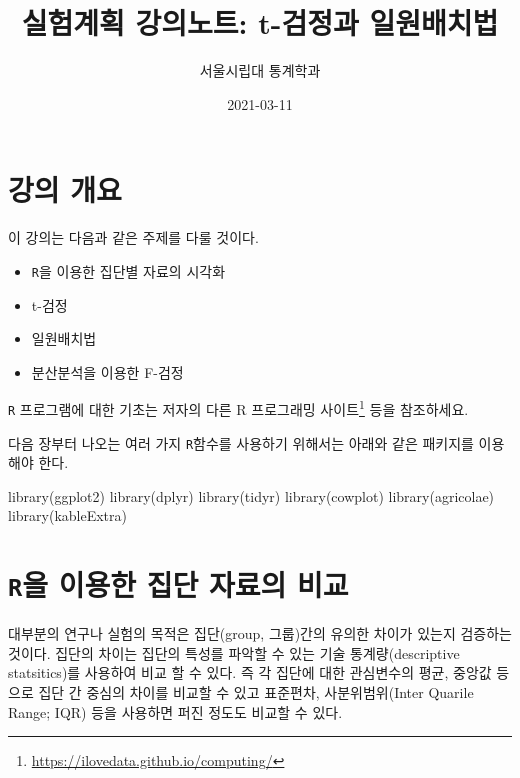 \documentclass[
]{book}
\title{실험계획 강의노트: t-검정과 일원배치법}
\author{서울시립대 통계학과}
\date{2021-03-11}
\newenvironment{Shaded}{\begin{snugshade}}{\end{snugshade}}
\newcommand{\FunctionTok}[1]{\textcolor[rgb]{0.00,0.00,0.00}{#1}}
\newcommand{\NormalTok}[1]{#1}
\providecommand{\tightlist}{%
  \setlength{\itemsep}{0pt}\setlength{\parskip}{0pt}}
\renewcommand{\href}[2]{#2\footnote{\url{#1}}}
\begin{document}
\maketitle

{
\setcounter{tocdepth}{1}
\tableofcontents
}
\hypertarget{uxac15uxc758-uxac1cuxc694}{%
\chapter*{강의 개요}\label{uxac15uxc758-uxac1cuxc694}}


이 강의는 다음과 같은 주제를 다룰 것이다.

\begin{itemize}
\tightlist
\item
  \texttt{R}을 이용한 집단별 자료의 시각화\\
\item
  t-검정
\item
  일원배치법
\item
  분산분석을 이용한 F-검정
\end{itemize}

\texttt{R} 프로그램에 대한 기초는 저자의 다른 \href{https://ilovedata.github.io/computing/}{R 프로그래밍 사이트} 등을 참조하세요.

다음 장부터 나오는 여러 가지 \texttt{R}함수를 사용하기 위해서는 아래와 같은 패키지를 이용해야 한다.

\begin{Shaded}
\begin{Highlighting}[]
\FunctionTok{library}\NormalTok{(ggplot2)}
\FunctionTok{library}\NormalTok{(dplyr)}
\FunctionTok{library}\NormalTok{(tidyr)}
\FunctionTok{library}\NormalTok{(cowplot)}
\FunctionTok{library}\NormalTok{(agricolae)}
\FunctionTok{library}\NormalTok{(kableExtra)}
\end{Highlighting}
\end{Shaded}

\mainmatter

\hypertarget{intro}{%
\chapter{\texorpdfstring{\texttt{R}을 이용한 집단 자료의 비교}{R을 이용한 집단 자료의 비교}}\label{intro}}

대부분의 연구나 실험의 목적은 집단(group, 그룹)간의 유의한 차이가 있는지 검증하는 것이다. 집단의 차이는 집단의 특성를 파악할 수 있는 기술 통계량(descriptive statsitics)를 사용하여 비교 할 수 있다. 즉 각 집단에 대한 관심변수의 평균, 중앙값 등으로 집단 간 중심의 차이를 비교할 수 있고 표준편차, 사분위범위(Inter Quarile Range; IQR) 등을 사용하면 퍼진 정도도 비교할 수 있다.
\end{document}
